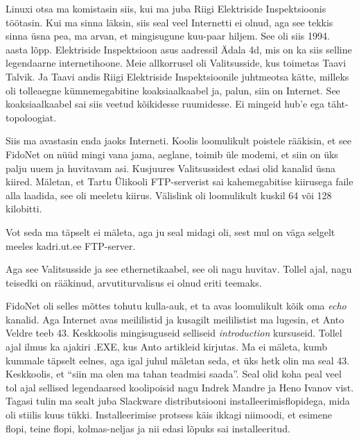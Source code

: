 
Linuxi otsa ma komistasin siis, kui ma juba Riigi Elektriside 
Inspektsioonis töötasin. Kui ma sinna 
läksin, siis seal veel Internetti ei olnud, aga see tekkis sinna üsna pea, ma 
arvan, et mingisugune kuu-paar hiljem. See oli siis 1994. aasta lõpp.  
Elektriside Inspektsioon asus aadressil Ädala 4d, mis on ka siis selline 
legendaarne internetihoone.  Meie allkorrusel oli 
Valitsusside, kus toimetas Taavi Talvik. Ja Taavi andis Riigi Elektriside Inspektsioonile juhtmeotsa kätte, 
milleks oli  tolleaegne kümnemegabitine koaksiaalkaabel ja, palun, siin on 
Internet. See koaksiaalkaabel sai siis veetud kõikidesse ruumidesse. Ei mingeid 
hub'e ega täht-topoloogiat.

Siis ma avastasin enda jaoks Interneti. Koolis loomulikult poistele rääkisin, et 
see FidoNet on nüüd mingi  vana jama, aeglane, toimib üle modemi, et siin on 
üks palju uuem ja huvitavam asi. Kusjuures  Valitsussidest edasi olid kanalid 
üsna kiired. Mäletan, et Tartu Ülikooli FTP-serverist sai kahemegabitise 
kiirusega faile alla laadida, see oli  meeletu kiirus. Välislink oli 
loomulikult kuskil 64 või 128 kilobitti. 


Vot seda ma täpselt ei mäleta, aga ju seal midagi oli, sest mul on väga selgelt 
meeles kadri.ut.ee  FTP-server. 

Aga see Valitsusside ja see ethernetikaabel, see oli nagu 
huvitav. Tollel ajal, nagu teisedki on rääkinud, arvutiturvalisus ei olnud 
eriti teemaks. 

FidoNet oli selles mõttes tohutu kulla-auk, et ta avas loomulikult kõik oma  
\emph{echo} kanalid. Aga Internet avas meililistid ja kusagilt meililistist ma 
lugesin, et Anto Veldre teeb 43. 
Keskkoolis mingisuguseid selliseid 
\emph{introduction} kursuseid. Tollel ajal ilmus ka ajakiri .EXE, 
kus Anto artikleid kirjutas. Ma ei mäleta, kumb kummale täpselt eelnes, aga 
igal juhul mäletan seda, et üks hetk olin ma seal 43. Keskkoolis, et 
\enquote{siin ma olen ma tahan teadmisi saada}. Seal olid koha peal veel tol 
ajal sellised legendaarsed koolipoisid nagu Indrek Mandre ja Heno Ivanov vist. Tagasi tulin ma sealt 
juba Slackware distributsiooni installeerimisflopidega, mida 
oli stiilis kuus tükki. Installeerimise protsess käis ikkagi niimoodi, et 
esimene flopi, teine flopi, kolmas-neljas ja nii edasi lõpuks sai 
installeeritud. 

